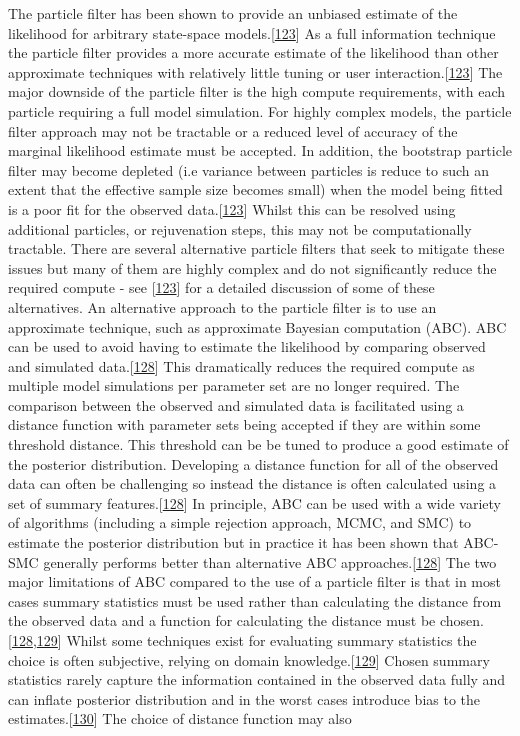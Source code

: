 \documentclass[11pt,twoside]{bristolthesis}
\begin{document}
  The particle filter has been shown to provide an unbiased estimate of the likelihood for arbitrary state-space models.{[}\protect\hyperlink{ref-Murray2015}{123}{]} As a full information technique the particle filter provides a more accurate estimate of the likelihood than other approximate techniques with relatively little tuning or user interaction.{[}\protect\hyperlink{ref-Murray2015}{123}{]} The major downside of the particle filter is the high compute requirements, with each particle requiring a full model simulation. For highly complex models, the particle filter approach may not be tractable or a reduced level of accuracy of the marginal likelihood estimate must be accepted. In addition, the bootstrap particle filter may become depleted (i.e variance between particles is reduce to such an extent that the effective sample size becomes small) when the model being fitted is a poor fit for the observed data.{[}\protect\hyperlink{ref-Murray2015}{123}{]} Whilst this can be resolved using additional particles, or rejuvenation steps, this may not be computationally tractable. There are several alternative particle filters that seek to mitigate these issues but many of them are highly complex and do not significantly reduce the required compute - see {[}\protect\hyperlink{ref-Murray2015}{123}{]} for a detailed discussion of some of these alternatives. An alternative approach to the particle filter is to use an approximate technique, such as approximate Bayesian computation (ABC). ABC can be used to avoid having to estimate the likelihood by comparing observed and simulated data.{[}\protect\hyperlink{ref-Toni2009}{128}{]} This dramatically reduces the required compute as multiple model simulations per parameter set are no longer required. The comparison between the observed and simulated data is facilitated using a distance function with parameter sets being accepted if they are within some threshold distance. This threshold can be be tuned to produce a good estimate of the posterior distribution. Developing a distance function for all of the observed data can often be challenging so instead the distance is often calculated using a set of summary features.{[}\protect\hyperlink{ref-Toni2009}{128}{]} In principle, ABC can be used with a wide variety of algorithms (including a simple rejection approach, MCMC, and SMC) to estimate the posterior distribution but in practice it has been shown that ABC-SMC generally performs better than alternative ABC approaches.{[}\protect\hyperlink{ref-Toni2009}{128}{]} The two major limitations of ABC compared to the use of a particle filter is that in most cases summary statistics must be used rather than calculating the distance from the observed data and a function for calculating the distance must be chosen.{[}\protect\hyperlink{ref-Toni2009}{128},\protect\hyperlink{ref-Lintusaari2016}{129}{]} Whilst some techniques exist for evaluating summary statistics the choice is often subjective, relying on domain knowledge.{[}\protect\hyperlink{ref-Lintusaari2016}{129}{]} Chosen summary statistics rarely capture the information contained in the observed data fully and can inflate posterior distribution and in the worst cases introduce bias to the estimates.{[}\protect\hyperlink{ref-Busetto2013}{130}{]} The choice of distance function may also 
\end{document}
